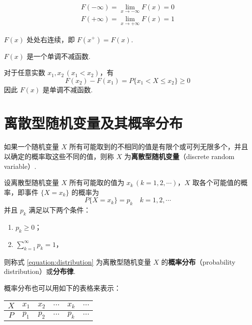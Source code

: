 \begin{property}
    \begin{gather*}
        F(-\infty)= \lim_{x \to -\infty} F(x)=0\\
        F(+\infty)= \lim_{x \to +\infty} F(x)=1
    \end{gather*}
\end{property}

\begin{property}
    $F(x)$ 处处右连续，即 $F(x^+)=F(x)$.
\end{property}

\begin{property}
    $F(x)$ 是一个单调不减函数.
\end{property}

\begin{myproof}
    对于任意实数 $x_1,x_2\, (x_1<x_2)$，有
    $$
    F(x_2)-F(x_1) = P\{x_1 < X \leqslant x_2\} \geqslant 0
    $$
    因此 $F(x)$ 是单调不减函数.
\end{myproof}

\section{离散型随机变量及其概率分布}

\begin{definition}
    如果一个随机变量 $X$ 所有可能取到的不相同的值是有限个或可列无限多个，并且以确定的概率取这些不同的值，则称 $X$ 为\textbf{离散型随机变量}（discrete random variable）.
\end{definition}

\begin{definition}
    设离散型随机变量 $X$ 所有可能取的值为 $x_k\, (k=1,2,\cdots)$，$X$ 取各个可能值的概率，即事件 $\{X=x_k\}$ 的概率为
    \begin{equation} \label{equation:distribution}
        P\{X=x_k\} = p_k \quad k=1,2,\cdots
    \end{equation}
    并且 $p_k$ 满足以下两个条件：
    \begin{enumerate}
        \item $p_k \geqslant 0$；
        \item $\displaystyle\sum_{k=1}^\infty p_k=1$，
    \end{enumerate}
    则称式 \eqref{equation:distribution} 为离散型随机变量 $X$ 的\textbf{概率分布}（probability distribution）或\textbf{分布律}.
\end{definition}

概率分布也可以用如下的表格来表示：
\begin{table*}[htbp]
    \centering

    \begin{tabular}{c | c c c c c}
        \hline
        $X$ & $x_1$ & $x_2$ & $\cdots$ & $x_k$ & $\cdots$ \\
        \hline
        $P$ & $p_1$ & $p_2$ & $\cdots$ & $p_k$ & $\cdots$ \\
        \hline
    \end{tabular}
\end{table*}

